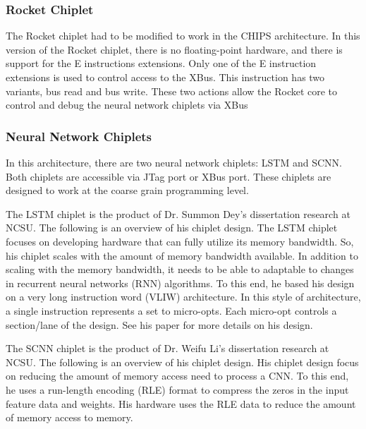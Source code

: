 \documentclass[../main.tex]{subfiles}
\begin{document}
\subsubsection{Rocket Chiplet}
The Rocket chiplet had to be modified to work in the CHIPS architecture. In this version of the Rocket chiplet, there is no floating-point hardware, and there is support for the E instructions extensions. Only one of the E instruction extensions is used to control access to the XBus. This instruction has two variants, bus read and bus write. These two actions allow the Rocket core to control and debug the neural network chiplets via XBus

\subsubsection{Neural Network Chiplets}
In this architecture, there are two neural network chiplets: LSTM and SCNN. Both chiplets are accessible via JTag port or XBus port. These chiplets are designed to work at the coarse grain programming level. 

The LSTM chiplet is the product of Dr. Summon Dey's dissertation research at NCSU. The following is an overview of his chiplet design\cite{Summon-Dey-LSTM}. The LSTM chiplet focuses on developing hardware that can fully utilize its memory bandwidth. So, his chiplet scales with the amount of memory bandwidth available. In addition to scaling with the memory bandwidth, it needs to be able to adaptable to changes in recurrent neural networks (RNN) algorithms. To this end, he based his design on a very long instruction word (VLIW) architecture. In this style of architecture, a single instruction represents a set to micro-opts. Each micro-opt controls a section/lane of the design. See his paper for more details on his design\cite{Summon-Dey-LSTM}.

The SCNN chiplet is the product of Dr. Weifu Li's dissertation research at NCSU. The following is an overview of his chiplet design\cite{LeWeifuDissertation}. His chiplet design focus on reducing the amount of memory access need to process a CNN. To this end, he uses a run-length encoding (RLE) format to compress the zeros in the input feature data and weights. His hardware uses the RLE data to reduce the amount of memory access to memory.
\end{document}
